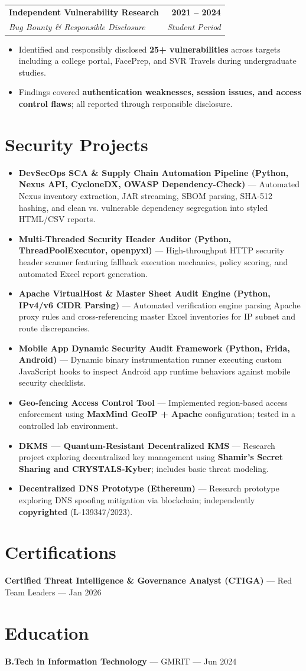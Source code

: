\documentclass[letterpaper,10pt]{article}
\makeatletter
\newcommand{\ResumeHeading}[4]{%
  \vspace{2pt}\noindent
  \begin{tabular*}{\textwidth}{@{\extracolsep{\fill}}p{0.72\textwidth} r}
    \textbf{#1} & \textbf{#2} \\
    \textit{#3} & \textit{\small #4} \\
  \end{tabular*}\vspace{3pt}
}
\newcommand{\resItem}[1]{\item \small #1}
\makeatother
\begin{document}
\ResumeHeading{Independent Vulnerability Research}{2021 -- 2024}{Bug Bounty \& Responsible Disclosure}{Student Period}
\begin{itemize}
  \resItem{Identified and responsibly disclosed \textbf{25+ vulnerabilities} across targets including a college portal, FacePrep, and SVR Travels during undergraduate studies.}
  \resItem{Findings covered \textbf{authentication weaknesses, session issues, and access control flaws}; all reported through responsible disclosure.}
\end{itemize}

\vspace{4pt}
\section*{Security Projects}
\begin{itemize}
  \resItem{\textbf{DevSecOps SCA \& Supply Chain Automation Pipeline (Python, Nexus API, CycloneDX, OWASP Dependency-Check)} — Automated Nexus inventory extraction, JAR streaming, SBOM parsing, SHA-512 hashing, and clean vs. vulnerable dependency segregation into styled HTML/CSV reports.}
  \resItem{\textbf{Multi-Threaded Security Header Auditor (Python, ThreadPoolExecutor, openpyxl)} — High-throughput HTTP security header scanner featuring fallback execution mechanics, policy scoring, and automated Excel report generation.}
  \resItem{\textbf{Apache VirtualHost \& Master Sheet Audit Engine (Python, IPv4/v6 CIDR Parsing)} — Automated verification engine parsing Apache proxy rules and cross-referencing master Excel inventories for IP subnet and route discrepancies.}
  \resItem{\textbf{Mobile App Dynamic Security Audit Framework (Python, Frida, Android)} — Dynamic binary instrumentation runner executing custom JavaScript hooks to inspect Android app runtime behaviors against mobile security checklists.}
  \resItem{\textbf{Geo-fencing Access Control Tool} — Implemented region-based access enforcement using \textbf{MaxMind GeoIP + Apache} configuration; tested in a controlled lab environment.}
  \resItem{\textbf{DKMS — Quantum-Resistant Decentralized KMS} — Research project exploring decentralized key management using \textbf{Shamir's Secret Sharing and CRYSTALS-Kyber}; includes basic threat modeling.}
  \resItem{\textbf{Decentralized DNS Prototype (Ethereum)} — Research prototype exploring DNS spoofing mitigation via blockchain; independently \textbf{copyrighted} (L-139347/2023).}
\end{itemize}

\section*{Certifications}
\textbf{Certified Threat Intelligence \& Governance Analyst (CTIGA)} — Red Team Leaders — Jan 2026

\section*{Education}
\textbf{B.Tech in Information Technology} — GMRIT — Jun 2024
\end{document}
